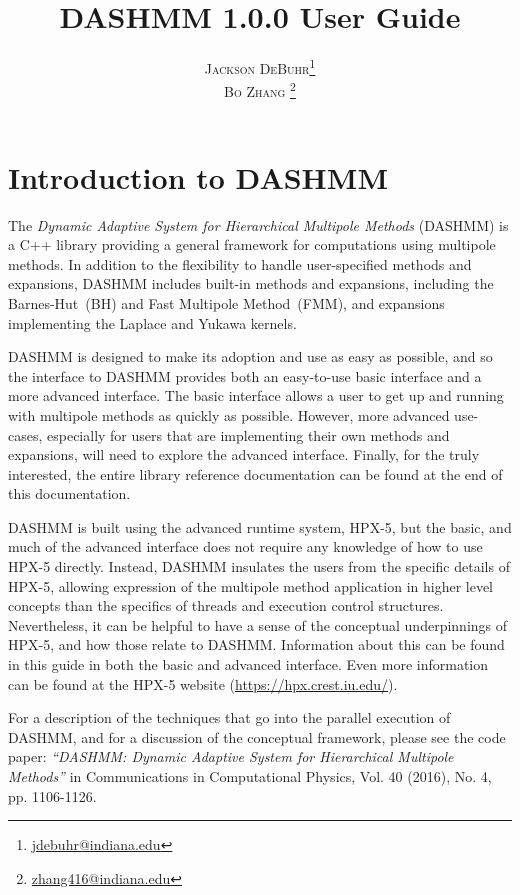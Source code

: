 \documentclass[11pt]{book}
\title{
\Huge 
\textbf{DASHMM 1.0.0 User Guide}
}
\author{
\textsc{Jackson DeBuhr}\thanks{\url{jdebuhr@indiana.edu}} \\
\textsc{Bo Zhang} \thanks{\url{zhang416@indiana.edu}}
}
\date{}
\begin{document}
\frontmatter
\maketitle

\tableofcontents

\mainmatter

\chapter{Introduction to DASHMM}

The {\it Dynamic Adaptive System for Hierarchical Multipole Methods}
(DASHMM) is a C++ library providing a general framework for
computations using multipole methods. In addition to the flexibility
to handle user-specified methods and expansions, DASHMM includes
built-in methods and expansions, including the Barnes-Hut~(BH) and
Fast Multipole Method~(FMM), and expansions implementing the Laplace
and Yukawa kernels. 

DASHMM is designed to make its adoption and use as easy as possible,
and so the interface to DASHMM provides both an easy-to-use basic
interface and a more advanced interface. The basic interface allows a
user to get up and running with multipole methods as quickly as
possible. However, more advanced use-cases, especially for users that
are implementing their own methods and expansions, will need to
explore the advanced interface. Finally, for the truly interested, the
entire library reference documentation can be found at the end of this
documentation. 

DASHMM is built using the advanced runtime system, HPX-5, but the
basic, and much of the advanced interface does not require any
knowledge of how to use HPX-5 directly. Instead, DASHMM insulates the
users from the specific details of HPX-5, allowing expression of the
multipole method application in higher level concepts than the
specifics of threads and execution control structures. Nevertheless,
it can be helpful to have a sense of the conceptual underpinnings of
HPX-5, and how those relate to DASHMM. Information about this can be
found in this guide in both the basic and advanced interface. Even
more information can be found at the HPX-5 website
(\url{https://hpx.crest.iu.edu/}). 

For a description of the techniques that go into the parallel
execution of DASHMM, and for a discussion of the conceptual framework,
please see the code paper: {\it ``DASHMM: Dynamic Adaptive System for
  Hierarchical Multipole Methods''} in Communications in Computational
Physics, Vol. 40 (2016), No. 4, pp. 1106-1126. 
\end{document}
